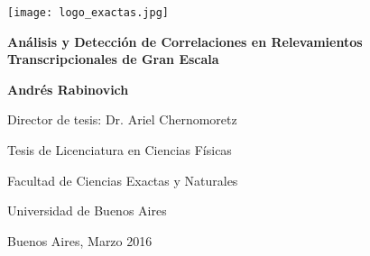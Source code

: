 \thispagestyle{empty}

\begin {center}

\texttt{[image: logo\_exactas.jpg]}

\vspace{5cm}

\textbf{\large Análisis y Detección de Correlaciones en Relevamientos Transcripcionales de Gran Escala}

\vspace{1cm}

\textbf{Andrés Rabinovich}

\vspace{1.5cm}

Director de tesis: Dr. Ariel Chernomoretz

\vspace{8cm}

Tesis de Licenciatura en Ciencias Físicas

Facultad de Ciencias Exactas y Naturales

Universidad de Buenos Aires

\vspace{1cm}

Buenos Aires, Marzo 2016

\end {center}
